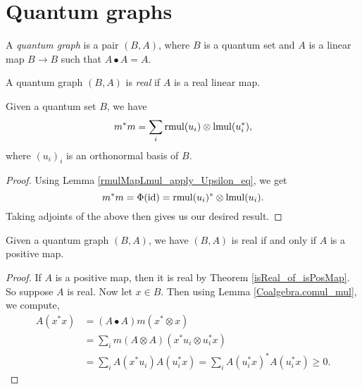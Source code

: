 \chapter{Quantum graphs}

\begin{definition}\label{QuantumGraph}
 \leanok
 A \textit{quantum graph} is a pair $(B,A)$, where $B$ is a quantum set and $A$ is a linear map $B\to B$ such that $A\bullet A=A$.
\end{definition}

\begin{definition}\label{QuantumGraph.Real}
 \leanok
 A quantum graph $(B,A)$ is \textit{real} if $A$ is a real linear map.
\end{definition}

\begin{lemma}\label{Coalgebra.comul_mul}
 \leanok
 Given a quantum set $B$, we have
 \[m^*m=\sum_i\operatorname{rmul}(u_i)\otimes\operatorname{lmul}(u_i^*),\]
 where $(u_i)_i$ is an orthonormal basis of $B$.
\end{lemma}
\begin{proof}\leanok
 Using Lemma \ref{rmulMapLmul_apply_Upsilon_eq}, we get
 \[m^*m=\Phi(\operatorname{id})=\operatorname{rmul}(u_i)^*\otimes\operatorname{lmul}(u_i).\]
 Taking adjoints of the above then gives us our desired result.
\end{proof}

\begin{lemma}\label{QuantumGraph.Real.isPosMap}
 \leanok
 Given a quantum graph $(B,A)$, we have $(B,A)$ is real if and only if $A$ is a positive map.
\end{lemma}
\begin{proof}\leanok
 If $A$ is a positive map, then it is real by Theorem \ref{isReal_of_isPosMap}.
 So suppose $A$ is real. Now let $x\in{B}$. Then using Lemma \ref{Coalgebra.comul_mul}, we compute,
 \begin{align*}
  A(x^*x) &= (A \bullet A)m(x^*\otimes x)\\
  &= \sum_im(A\otimes A)(x^*u_i\otimes u_i^*x)\\
  &= \sum_iA(x^*u_i)A(u_i^*x)=\sum_i{A(u_i^*x)}^*A(u_i^*x) \geq0.
 \end{align*}
\end{proof}
